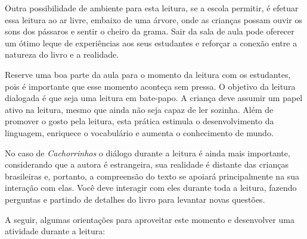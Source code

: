 \documentclass[11pt]{extarticle}
\begin{document}
Outra possibilidade de ambiente para esta leitura, se a escola permitir, 
é efetuar essa leitura ao ar livre, embaixo de uma árvore, onde as crianças 
possam ouvir os sons dos pássaros e sentir o cheiro da grama. Sair da sala 
de aula pode oferecer um ótimo leque de experiências aos seus estudantes e 
reforçar a conexão entre a natureza do livro e a realidade.  

Reserve uma boa parte da aula para o momento da leitura com os estudantes, 
pois é importante que esse momento aconteça sem pressa. O objetivo da 
leitura dialogada é que seja uma leitura em bate-papo. A criança deve 
assumir um papel ativo na leitura, mesmo que ainda não seja capaz de 
ler sozinha. Além de promover o gosto pela leitura, esta prática estimula 
o desenvolvimento da linguagem, enriquece o vocabulário e 
aumenta o conhecimento de mundo.

No caso de \textit{Cachorrinhos} o diálogo durante a leitura é 
ainda mais importante, considerando que a autora é estrangeira, sua realidade é distante das crianças brasileiras e, portanto, a compreensão do texto se apoiará principalmente na sua interação com elas. 
Você deve interagir com eles durante toda a 
leitura, fazendo perguntas e partindo de detalhes do livro para 
levantar novas questões. 

A seguir, algumas orientações para aproveitar este momento e desenvolver uma atividade durante a leitura: 
\end{document}
